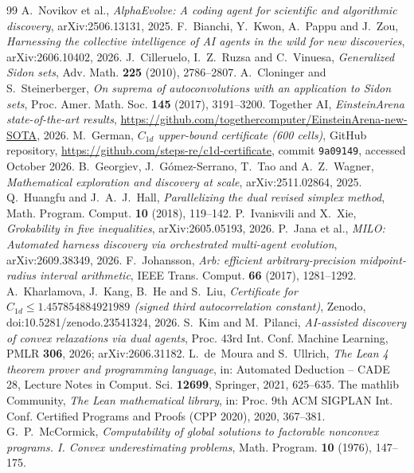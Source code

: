 \documentclass[11pt]{amsart}
\theoremstyle{definition}
\theoremstyle{remark}
\numberwithin{equation}{section}
\begin{document}
\begin{thebibliography}{99}
 A.~Novikov et al., \emph{AlphaEvolve: A coding agent for scientific and algorithmic discovery}, arXiv:2506.13131, 2025.
 F.~Bianchi, Y.~Kwon, A.~Pappu and J.~Zou, \emph{Harnessing the collective intelligence of AI agents in the wild for new discoveries}, arXiv:2606.10402, 2026.
 J.~Cilleruelo, I.~Z.~Ruzsa and C.~Vinuesa, \emph{Generalized Sidon sets}, Adv. Math. \textbf{225} (2010), 2786--2807.
 A.~Cloninger and S.~Steinerberger, \emph{On suprema of autoconvolutions with an application to Sidon sets}, Proc. Amer. Math. Soc. \textbf{145} (2017), 3191--3200.
 Together AI, \emph{EinsteinArena state-of-the-art results}, \url{https://github.com/togethercomputer/EinsteinArena-new-SOTA}, 2026.
 M.~German, \emph{$C_{1d}$ upper-bound certificate (600 cells)}, GitHub repository, \url{https://github.com/steps-re/c1d-certificate}, commit \texttt{9a09149}, accessed October 2026.
 B.~Georgiev, J.~G\'omez-Serrano, T.~Tao and A.~Z.~Wagner, \emph{Mathematical exploration and discovery at scale}, arXiv:2511.02864, 2025.
 Q.~Huangfu and J.~A.~J.~Hall, \emph{Parallelizing the dual revised simplex method}, Math. Program. Comput. \textbf{10} (2018), 119--142.
 P.~Ivanisvili and X.~Xie, \emph{Grokability in five inequalities}, arXiv:2605.05193, 2026.
 P.~Jana et al., \emph{MILO: Automated harness discovery via orchestrated multi-agent evolution}, arXiv:2609.38349, 2026.
 F.~Johansson, \emph{Arb: efficient arbitrary-precision midpoint-radius interval arithmetic}, IEEE Trans. Comput. \textbf{66} (2017), 1281--1292.
 A.~Kharlamova, J.~Kang, B.~He and S.~Liu, \emph{Certificate for $C_{1d}\le1.457854884921989$ (signed third autocorrelation constant)}, Zenodo, doi:10.5281/zenodo.23541324, 2026.
 S.~Kim and M.~Pilanci, \emph{AI-assisted discovery of convex relaxations via dual agents}, Proc. 43rd Int. Conf. Machine Learning, PMLR \textbf{306}, 2026; arXiv:2606.31182.
 L.~de~Moura and S.~Ullrich, \emph{The Lean 4 theorem prover and programming language}, in: Automated Deduction -- CADE 28, Lecture Notes in Comput. Sci. \textbf{12699}, Springer, 2021, 625--635.
 The mathlib Community, \emph{The Lean mathematical library}, in: Proc. 9th ACM SIGPLAN Int. Conf. Certified Programs and Proofs (CPP 2020), 2020, 367--381.
 G.~P.~McCormick, \emph{Computability of global solutions to factorable nonconvex programs. I. Convex underestimating problems}, Math. Program. \textbf{10} (1976), 147--175.

\end{thebibliography}
\end{document}
